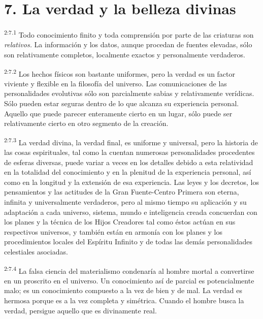 \section*{7. La verdad y la belleza divinas}
\par
\textsuperscript{2:7.1} Todo conocimiento finito y toda comprensión por parte de las criaturas son \textit{relativos.} La información y los datos, aunque procedan de fuentes elevadas, sólo son relativamente completos, localmente exactos y personalmente verdaderos.

\par
\textsuperscript{2:7.2} Los hechos físicos son bastante uniformes, pero la verdad es un factor viviente y flexible en la filosofía del universo. Las comunicaciones de las personalidades evolutivas sólo son parcialmente sabias y relativamente verídicas. Sólo pueden estar seguras dentro de lo que alcanza su experiencia personal. Aquello que puede parecer enteramente cierto en un lugar, sólo puede ser relativamente cierto en otro segmento de la creación.

\par
\textsuperscript{2:7.3} La verdad divina, la verdad final, es uniforme y universal, pero la historia de las cosas espirituales, tal como la cuentan numerosas personalidades procedentes de esferas diversas, puede variar a veces en los detalles debido a esta relatividad en la totalidad del conocimiento y en la plenitud de la experiencia personal, así como en la longitud y la extensión de esa experiencia. Las leyes y los decretos, los pensamientos y las actitudes de la Gran Fuente-Centro Primera son eterna, infinita y universalmente verdaderos, pero al mismo tiempo su aplicación y su adaptación a cada universo, sistema, mundo e inteligencia creada concuerdan con los planes y la técnica de los Hijos Creadores tal como éstos actúan en sus respectivos universos, y también están en armonía con los planes y los procedimientos locales del Espíritu Infinito y de todas las demás personalidades celestiales asociadas.

\par
\textsuperscript{2:7.4} La falsa ciencia del materialismo condenaría al hombre mortal a convertirse en un proscrito en el universo. Un conocimiento así de parcial es potencialmente malo; es un conocimiento compuesto a la vez de bien y de mal. La verdad es hermosa porque es a la vez completa y simétrica. Cuando el hombre busca la verdad, persigue aquello que es divinamente real.


